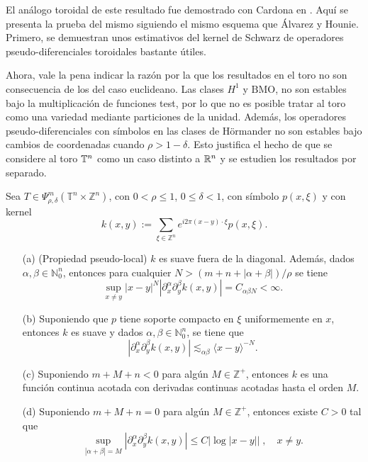 El análogo toroidal de este resultado fue demostrado con Cardona en 
\cite{Cardona:Martinez}. Aquí se presenta la prueba del mismo siguiendo el mismo esquema que \'Alvarez y Hounie. Primero, se demuestran unos estimativos del kernel de Schwarz de operadores pseudo-diferenciales toroidales bastante útiles.
\begin{remark}
	Ahora, vale la pena indicar la razón por la que los resultados en el toro no son consecuencia de los del caso euclideano. Las clases $H^1$ y $\mathrm{BMO}$, no son estables bajo la multiplicación de funciones test, por lo que no es posible tratar al toro como una variedad mediante particiones de la unidad. Además, los operadores pseudo-diferenciales con símbolos en las clases de Hörmander no son estables bajo cambios de coordenadas cuando $\rho>1-\delta$. Esto justifica el hecho de que se considere al toro $\mathbb{T}^n$ como un caso distinto a $\mathbb{R}^n$ y se estudien los resultados por separado.
\end{remark}
\begin{theorem}\label{theo:kernel-properties}
	Sea $T \in \Psi^m_{\rho, \delta}(\mathbb{T}^n \times \mathbb{Z}^n) $, con $0 < \rho \leq 1$, $0 \leq \delta < 1$, con símbolo $p(x, \xi)$ y con kernel
	\begin{equation}
		k(x, y) := \sum_{\xi \in \mathbb{Z}^n} e^{i2\pi(x - y) \cdot \xi} p(x, \xi).
	\end{equation}
	\begin{enumerate}
		\item[(a)] (Propiedad pseudo-local) $k$ es suave fuera de la diagonal. Además, dados $\alpha, \beta \in \mathbb{N}^n_0$, entonces para cualquier $N > (m + n + |\alpha + \beta|)/\rho$ se tiene
		\begin{equation}
			\sup_{x \neq y} |x - y|^N |\partial^\alpha_x \partial^\beta_y k(x, y)| = C_{\alpha\beta N} < \infty.
			\label{eq:teo3-1a}
		\end{equation}
		\item[(b)] Suponiendo que $p$ tiene soporte compacto en $\xi$ uniformemente en $x$, entonces $k$ es suave y dados $\alpha, \beta \in \mathbb{N}^n_0$, se tiene que 
		\begin{equation}
			|\partial^\alpha_x \partial^\beta_y k(x, y)| \lesssim_{\alpha\beta} \langle x - y \rangle^{-N}.
		\end{equation}
		\item[(c)] Suponiendo $m + M + n < 0$ para algún $M \in \mathbb{Z}^+$, entonces $k$ es una función continua acotada con derivadas continuas acotadas hasta el orden $M$.\\
		\item[(d)] Suponiendo $m + M + n = 0$ para algún $M \in \mathbb{Z}^+$, entonces existe $ C >0$ tal que 
		\begin{equation}
			\sup_{|\alpha + \beta| = M} |\partial^\alpha_x \partial^\beta_y k(x, y)| \leq C | \log |x-y| | \; , \quad x \neq y.
		\end{equation} 
	\end{enumerate}
\end{theorem}
